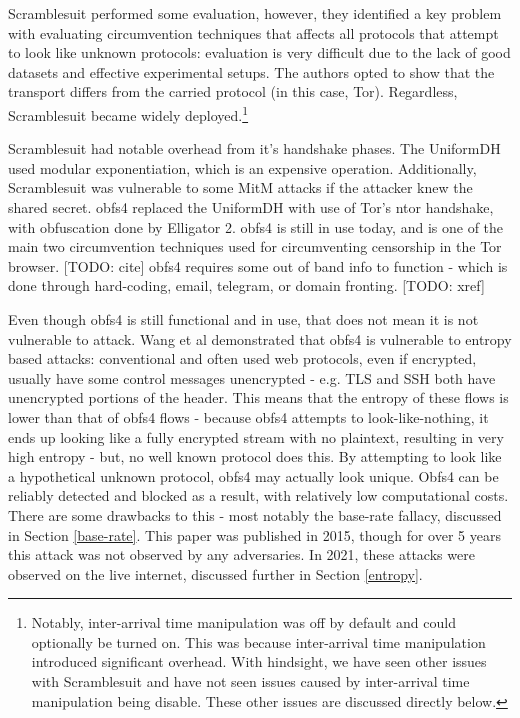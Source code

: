 \documentclass[12pt]{report}
\begin{document}
Scramblesuit performed some evaluation, however, they identified a key problem with evaluating circumvention techniques that affects all protocols that attempt to look like unknown protocols: evaluation is very difficult due to the lack of good datasets and effective experimental setups. The authors opted to show that the transport differs from the carried protocol (in this case, Tor).\cite{scramblesuit} Regardless, Scramblesuit became widely deployed.\footnote{Notably, inter-arrival time manipulation was off by default and could optionally be turned on. This was because inter-arrival time manipulation introduced significant overhead. With hindsight, we have seen other issues with Scramblesuit and have not seen issues caused by inter-arrival time manipulation being disable. These other issues are discussed directly below.}

Scramblesuit had notable overhead from it's handshake phases. The UniformDH used modular exponentiation, which is an expensive operation.\cite{obfs4} Additionally, Scramblesuit was vulnerable to some MitM attacks if the attacker knew the shared secret.\cite{obfs4} obfs4 replaced the UniformDH with use of Tor's ntor handshake, with obfuscation done by Elligator 2.\cite{obfs4} obfs4 is still in use today, and is one of the main two circumvention techniques used for circumventing censorship in the Tor browser. [TODO: cite] obfs4 requires some out of band info to function - which is done through hard-coding, email, telegram, or domain fronting. [TODO: xref]

Even though obfs4 is still functional and in use, that does not mean it is not vulnerable to attack. Wang et al demonstrated that obfs4 is vulnerable to entropy based attacks: conventional and often used web protocols, even if encrypted, usually have some control messages unencrypted - e.g. TLS and SSH both have unencrypted portions of the header. This means that the entropy of these flows is lower than that of obfs4 flows - because obfs4 attempts to look-like-nothing, it ends up looking like a fully encrypted stream with no plaintext, resulting in very high entropy - but, no well known protocol does this. By attempting to look like a hypothetical unknown protocol, obfs4 may actually look unique.\cite{wang} Obfs4 can be reliably detected and blocked as a result, with relatively low computational costs. There are some drawbacks to this - most notably the base-rate fallacy, discussed in Section \ref{base-rate}. This paper was published in 2015, though for over 5 years this attack was not observed by any adversaries. In 2021, these attacks were observed on the live internet, discussed further in Section \ref{entropy}.
\end{document}
